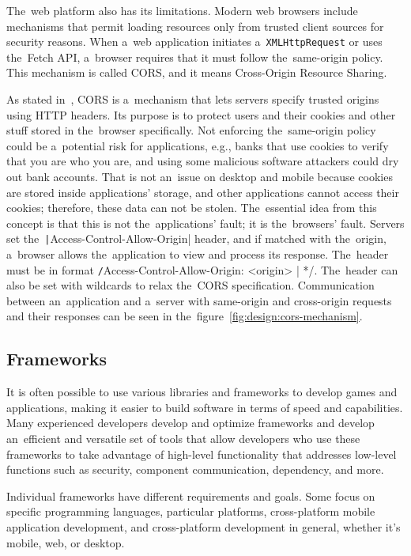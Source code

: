 The~web platform also has its limitations.
Modern web browsers include mechanisms that permit loading resources only from trusted client sources for security reasons.
When a~web application initiates a~\texttt{XMLHttpRequest} or uses the~Fetch API, a~browser requires that it must follow the~same-origin policy.
This mechanism is called CORS, and it means Cross-Origin Resource Sharing.

As stated in~\cite{a2022_crossorigin}, CORS is a~mechanism that lets servers specify trusted origins using HTTP headers.
Its purpose is to protect users and their cookies and other stuff stored in the~browser specifically.
Not enforcing the~same-origin policy could be a~potential risk for applications, e.g., banks that use cookies to verify that you are who you are, and using some malicious software attackers could dry out bank accounts.
That is not an~issue on desktop and mobile because cookies are stored inside applications' storage, and other applications cannot access their cookies; therefore, these data can not be stolen.
The~essential idea from this concept is that this is not the~applications' fault; it is the~browsers' fault.
Servers set the~\texttt|Access-Control-Allow-Origin| header, and if matched with the~origin, a~browser allows the~application to view and process its response. The~header must be in format \texttt/Access-Control-Allow-Origin: <origin> | */.
The~header can also be set with wildcards to relax the~CORS specification.
Communication between an~application and a~server with same-origin and cross-origin requests and their responses can be seen in the~figure~\ref{fig:design:cors-mechanism}.

\subsection{Frameworks}

It is often possible to use various libraries and frameworks to develop games and applications, making it easier to build software in terms of speed and capabilities.
Many experienced developers develop and optimize frameworks and develop an~efficient and versatile set of tools that allow developers who use these frameworks to take advantage of high-level functionality that addresses low-level functions such as security, component communication, dependency, and more.

Individual frameworks have different requirements and goals.
Some focus on specific programming languages, particular platforms, cross-platform mobile application development, and cross-platform development in general, whether it's mobile, web, or desktop.

